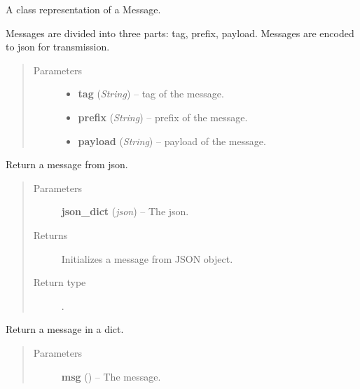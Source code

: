 \documentclass[letterpaper,10pt,english]{sphinxmanual}
\begin{document}
\begin{fulllineitems}
\label{swnp:swnp.Message}
A class representation of a Message.

Messages are divided into three parts: tag, prefix, payload.
Messages are encoded to json for transmission.
\begin{quote}\begin{description}
\item[{Parameters}] \leavevmode\begin{itemize}
\item {} 
\textbf{tag} (\emph{String}) -- tag of the message.

\item {} 
\textbf{prefix} (\emph{String}) -- prefix of the message.

\item {} 
\textbf{payload} (\emph{String}) -- payload of the message.

\end{itemize}

\end{description}\end{quote}

\begin{fulllineitems}
\label{swnp:swnp.Message.from_json}
Return a message from json.
\begin{quote}\begin{description}
\item[{Parameters}] \leavevmode
\textbf{json\_dict} (\emph{json}) -- The json.

\item[{Returns}] \leavevmode
Initializes a message from JSON object.

\item[{Return type}] \leavevmode
{\hyperref[swnp:swnp.Message]{}}.

\end{description}\end{quote}

\end{fulllineitems}


\begin{fulllineitems}
\label{swnp:swnp.Message.to_dict}
Return a message in a dict.
\begin{quote}\begin{description}
\item[{Parameters}] \leavevmode
\textbf{msg} ({\hyperref[swnp:swnp.Message]{}}) -- The message.


\end{description}
\end{quote}
\end{fulllineitems}
\end{fulllineitems}
\end{document}
